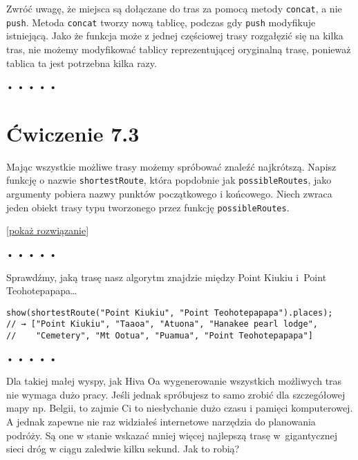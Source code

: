   
Zwróć uwagę, że miejsca są dołączane do tras za pomocą metody \texttt{concat}, a nie \texttt{push}. Metoda \texttt{concat} tworzy nową tablicę, podczas gdy \texttt{push} modyfikuje istniejącą. Jako że funkcja może z jednej częściowej trasy rozgałęzić się na kilka tras, nie możemy modyfikować tablicy reprezentującej oryginalną trasę, ponieważ tablica ta jest potrzebna kilka razy.



\begin{center}
• • • • •
\end{center}

  
\section*{Ćwiczenie 7.3}
\label{sec:7.3}
  
    
Mając wszystkie możliwe trasy możemy spróbować znaleźć najkrótszą. Napisz funkcję o nazwie \texttt{shortestRoute}, która popdobnie jak \texttt{possibleRoutes}, jako argumenty pobiera nazwy punktów początkowego i końcowego. Niech zwraca jeden obiekt trasy typu tworzonego przez funkcję \texttt{possibleRoutes}.

  
[\hyperref[sol:7.3]{pokaż rozwiązanie}]
  


\begin{center}
• • • • •
\end{center}

  
Sprawdźmy, jaką trasę nasz algorytm znajdzie między Point Kiukiu i~Point Teohotepapapa…

  
\begin{verbatim} 
show(shortestRoute("Point Kiukiu", "Point Teohotepapapa").places);
// → ["Point Kiukiu", "Taaoa", "Atuona", "Hanakee pearl lodge", 
//    "Cemetery", "Mt Ootua", "Puamua", "Point Teohotepapapa"]
\end{verbatim}


\begin{center}
• • • • •
\end{center}

  
Dla takiej małej wyspy, jak Hiva Oa wygenerowanie wszystkich możliwych tras nie wymaga dużo pracy. Jeśli jednak spróbujesz to samo zrobić dla szczegółowej mapy np. Belgii, to zajmie Ci to niesłychanie dużo czasu i pamięci komputerowej. A jednak zapewne nie raz widziałeś internetowe narzędzia do planowania podróży. Są one w stanie wskazać mniej więcej najlepszą trasę w~gigantycznej sieci dróg w ciągu zaledwie kilku sekund. Jak to robią?

